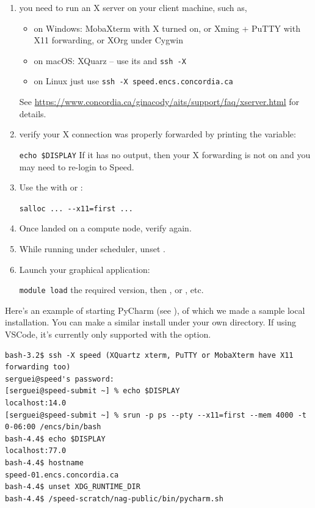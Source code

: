 \begin{enumerate}
\item
you need to run an X server on your client machine, such as,
\begin{itemize}
\item on Windows: MobaXterm with X turned on, or Xming + PuTTY with X11 forwarding, or XOrg under Cygwin
\item on macOS: XQuarz -- use its  and \texttt{ssh -X}
\item on Linux just use \texttt{ssh -X speed.encs.concordia.ca} 
\end{itemize}

See \url{https://www.concordia.ca/ginacody/aits/support/faq/xserver.html}
for details.

\item
verify your X connection was properly forwarded by printing the  variable:

\verb+echo $DISPLAY+
If it has no output, then your X forwarding is not on and you may need to re-login to Speed.

\item
Use the  with  or :

\verb+salloc ... --x11=first ...+

\item
Once landed on a compute node, verify  again.

\item
While running under scheduler, unset .

\item
Launch your graphical application:

\texttt{module load} the required version, then
, or , etc.
\end{enumerate}

Here's an example of starting PyCharm (see ), of which we made a sample local installation.
You can make a similar install under your own directory. If using VSCode, it's
currently only supported with the  option.

\scriptsize
\begin{verbatim}
bash-3.2$ ssh -X speed (XQuartz xterm, PuTTY or MobaXterm have X11 forwarding too)
serguei@speed's password: 
[serguei@speed-submit ~] % echo $DISPLAY
localhost:14.0
[serguei@speed-submit ~] % srun -p ps --pty --x11=first --mem 4000 -t 0-06:00 /encs/bin/bash
bash-4.4$ echo $DISPLAY
localhost:77.0
bash-4.4$ hostname
speed-01.encs.concordia.ca
bash-4.4$ unset XDG_RUNTIME_DIR
bash-4.4$ /speed-scratch/nag-public/bin/pycharm.sh
\end{verbatim}
\normalsize

